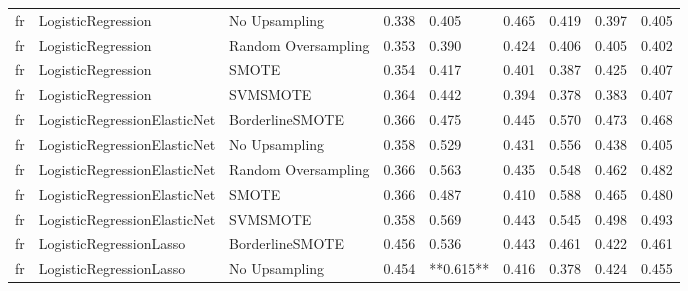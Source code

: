 \begin{tabular}{lllllllll}
      fr &              LogisticRegression &                 No Upsampling & 0.338 &                     0.405 &                 0.465 &                  0.419 &                                   0.397 &     0.405 \\
      fr &              LogisticRegression &           Random Oversampling & 0.353 &                     0.390 &                 0.424 &                  0.406 &                                   0.405 &     0.402 \\
      fr &              LogisticRegression &                         SMOTE & 0.354 &                     0.417 &                 0.401 &                  0.387 &                                   0.425 &     0.407 \\
      fr &              LogisticRegression &                      SVMSMOTE & 0.364 &                     0.442 &                 0.394 &                  0.378 &                                   0.383 &     0.407 \\
      fr &    LogisticRegressionElasticNet &               BorderlineSMOTE & 0.366 &                     0.475 &                 0.445 &                  0.570 &                                   0.473 &     0.468 \\
      fr &    LogisticRegressionElasticNet &                 No Upsampling & 0.358 &                     0.529 &                 0.431 &                  0.556 &                                   0.438 &     0.405 \\
      fr &    LogisticRegressionElasticNet &           Random Oversampling & 0.366 &                     0.563 &                 0.435 &                  0.548 &                                   0.462 &     0.482 \\
      fr &    LogisticRegressionElasticNet &                         SMOTE & 0.366 &                     0.487 &                 0.410 &                  0.588 &                                   0.465 &     0.480 \\
      fr &    LogisticRegressionElasticNet &                      SVMSMOTE & 0.358 &                     0.569 &                 0.443 &                  0.545 &                                   0.498 &     0.493 \\
      fr &         LogisticRegressionLasso &               BorderlineSMOTE & 0.456 &                     0.536 &                 0.443 &                  0.461 &                                   0.422 &     0.461 \\
      fr &         LogisticRegressionLasso &                 No Upsampling & 0.454 &                 **0.615** &                 0.416 &                  0.378 &                                   0.424 &     0.455 \\

\end{tabular}
